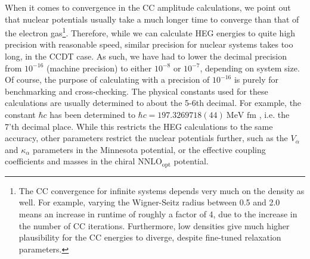 \documentclass[10pt,twoside]{report}
\begin{document}
	When it comes to convergence in the CC amplitude calculations, we point out that nuclear potentials usually take a much longer time to converge than that of the electron gas\footnote{The CC convergence for infinite systems depends very much on the density as well. For example, varying the Wigner-Seitz radius between 0.5 and 2.0 means an increase in runtime of roughly a factor of 4, due to the increase in the number of CC iterations. Furthermore, low densities give much higher plausibility for the CC energies to diverge, despite fine-tuned relaxation parameters.}. Therefore, while we can calculate HEG energies to quite high precision with reasonable speed, similar precision for nuclear systems takes too long, in the CCDT case. As such, we have had to lower the decimal precision from $10^{-16}$ (machine precision) to either $10^{-8}$ or $10^{-7}$, depending on system size. Of course, the purpose of calculating with a precision of $10^{-16}$ is purely for benchmarking and cross-checking. The physical constants used for these calculations are usually determined to about the 5-6th decimal. For example, the constant $\hbar c$ has been determined to $\hbar c = 197.3269718(44)\:\text{MeV fm}$ \cite{PartiPhysBooklet}, i.e. the 7'th decimal place. While this restricts the HEG calculations to the same accuracy, other parameters restrict the nuclear potentials further, such as the $V_\alpha$ and $\kappa_\alpha$ parameters in the Minnesota potential, or the effective coupling coefficients and masses in the chiral $\text{NNLO}_{\text{opt}}$ potential.
	
\end{document}
